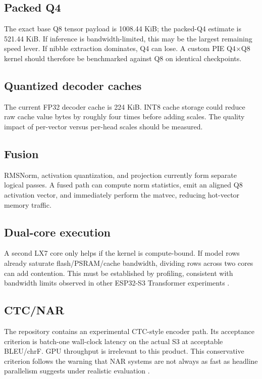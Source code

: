 \documentclass{article}
\begin{document}
\subsection{Packed Q4}
The exact base Q8 tensor payload is 1008.44 KiB; the packed-Q4 estimate is 521.44 KiB. If inference is bandwidth-limited, this may be the largest remaining speed lever. If nibble extraction dominates, Q4 can lose. A custom PIE Q4$\times$Q8 kernel should therefore be benchmarked against Q8 on identical checkpoints.

\subsection{Quantized decoder caches}
The current FP32 decoder cache is 224 KiB. INT8 cache storage could reduce raw cache value bytes by roughly four times before adding scales. The quality impact of per-vector versus per-head scales should be measured.

\subsection{Fusion}
RMSNorm, activation quantization, and projection currently form separate logical passes. A fused path can compute norm statistics, emit an aligned Q8 activation vector, and immediately perform the matvec, reducing hot-vector memory traffic.

\subsection{Dual-core execution}
A second LX7 core only helps if the kernel is compute-bound. If model rows already saturate flash/PSRAM/cache bandwidth, dividing rows across two cores can add contention. This must be established by profiling, consistent with bandwidth limits observed in other ESP32-S3 Transformer experiments \citep{dory2026esp32llm}.

\subsection{CTC/NAR}
The repository contains an experimental CTC-style encoder path. Its acceptance criterion is batch-one wall-clock latency on the actual S3 at acceptable BLEU/chrF. GPU throughput is irrelevant to this product. This conservative criterion follows the warning that NAR systems are not always as fast as headline parallelism suggests under realistic evaluation \citep{helcl2022nar}.
\end{document}
